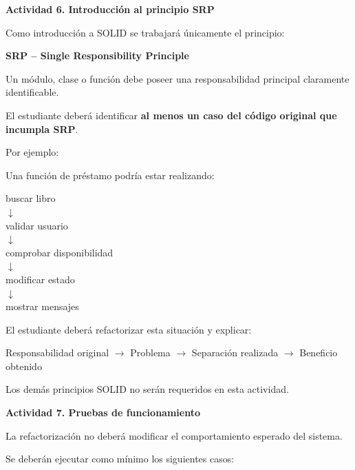 \documentclass[12pt,letterpaper]{article}
\newcommand{\flechar}{$\rightarrow$}
\begin{document}
\vspace{8pt}

\noindent\textbf{Actividad 6. Introducci\'on al principio SRP}

\vspace{2pt}
Como introducci\'on a SOLID se trabajar\'a \'unicamente el principio:

\textbf{SRP -- Single Responsibility Principle}

Un m\'odulo, clase o funci\'on debe poseer una responsabilidad principal claramente identificable.

El estudiante deber\'a identificar \textbf{al menos un caso del c\'odigo original que incumpla SRP}.

Por ejemplo:

Una funci\'on de pr\'estamo podr\'ia estar realizando:

\begin{center}
buscar libro\\
$\downarrow$\\
validar usuario\\
$\downarrow$\\
comprobar disponibilidad\\
$\downarrow$\\
modificar estado\\
$\downarrow$\\
mostrar mensajes
\end{center}

El estudiante deber\'a refactorizar esta situaci\'on y explicar:

Responsabilidad original \flechar{} Problema \flechar{} Separaci\'on realizada \flechar{} Beneficio obtenido

Los dem\'as principios SOLID no ser\'an requeridos en esta actividad.

\vspace{8pt}

\noindent\textbf{Actividad 7. Pruebas de funcionamiento}

\vspace{2pt}
La refactorizaci\'on no deber\'a modificar el comportamiento esperado del sistema.

Se deber\'an ejecutar como m\'inimo los siguientes casos:

\vspace{4pt}
\end{document}
